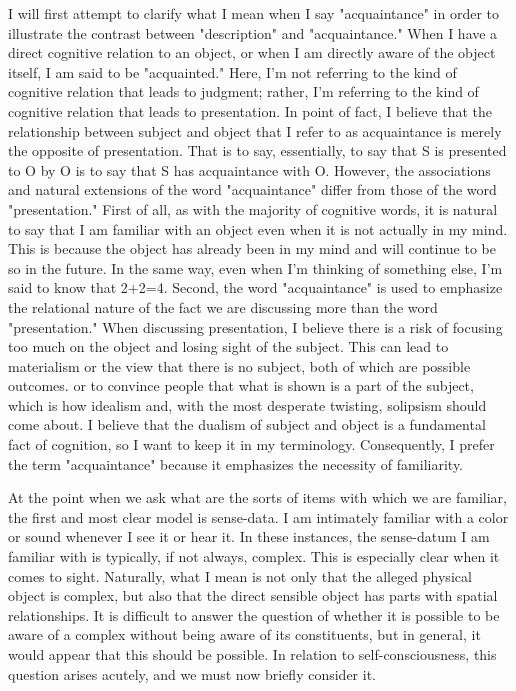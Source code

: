 \documentclass[a4paper,12pt]{book}[2004/02/16]
\theoremstyle{ilemma}
\theoremstyle{itheorem}
\theoremstyle{iother}
\theoremstyle{icorollary}
\theoremstyle{numcorollary}
\theoremstyle{idefinition}
\begin{document}
I will first attempt to clarify what I mean when I say "acquaintance" in order to illustrate the contrast between "description" and "acquaintance." When I have a direct cognitive relation to an object, or when I am directly aware of the object itself, I am said to be "acquainted." Here, I'm not referring to the kind of cognitive relation that leads to judgment; rather, I'm referring to the kind of cognitive relation that leads to presentation. In point of fact, I believe that the relationship between subject and object that I refer to as acquaintance is merely the opposite of presentation. That is to say, essentially, to say that S is presented to O by O is to say that S has acquaintance with O. However, the associations and natural extensions of the word "acquaintance" differ from those of the word "presentation." First of all, as with the majority of cognitive words, it is natural to say that I am familiar with an object even when it is not actually in my mind. This is because the object has already been in my mind and will continue to be so in the future. In the same way, even when I'm thinking of something else, I'm said to know that 2+2=4. Second, the word "acquaintance" is used to emphasize the relational nature of the fact we are discussing more than the word "presentation." When discussing presentation, I believe there is a risk of focusing too much on the object and losing sight of the subject. This can lead to materialism or the view that there is no subject, both of which are possible outcomes. or to convince people that what is shown is a part of the subject, which is how idealism and, with the most desperate twisting, solipsism should come about. I believe that the dualism of subject and object is a fundamental fact of cognition, so I want to keep it in my terminology. Consequently, I prefer the term "acquaintance" because it emphasizes the necessity of familiarity.

At the point when we ask what are the sorts of items with which we are
familiar, the first and most clear model is sense-data. I am intimately familiar with a color or sound whenever I see it or hear it. In these instances, the sense-datum I am familiar with is typically, if not always, complex. This is especially clear when it comes to sight. Naturally, what I mean is not only that the alleged physical object is complex, but also that the direct sensible object has parts with spatial relationships. It is difficult to answer the question of whether it is possible to be aware of a complex without being aware of its constituents, but in general, it would appear that this should be possible. In relation to self-consciousness, this question arises acutely, and we must now briefly consider it.
\end{document}
